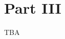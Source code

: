 \documentclass[11pt,openany]{article}
\renewcommand{\vec}[1]{\mathbf{#1}}
\begin{document}
%	
\newpage
\section{Part III}
TBA
\end{document}
